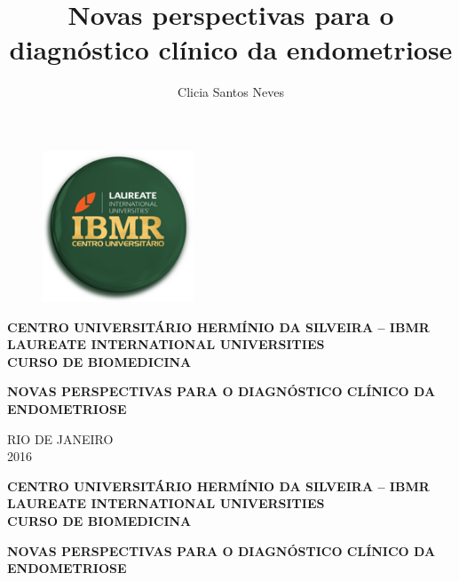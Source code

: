 \documentclass[12pt]{article} %
\title{Novas perspectivas para o diagnóstico clínico da endometriose}
\author{Clicia Santos Neves}
\begin{document}
\begin{figure}[h!]
\centering
\includegraphics[width=4.5cm]{ibmr.png}
\end{figure}
 \selectfont

\begin{center}
\textbf{CENTRO UNIVERSITÁRIO HERMÍNIO DA SILVEIRA – IBMR \\
LAUREATE INTERNATIONAL UNIVERSITIES \\
CURSO DE BIOMEDICINA}
\end{center}

\vspace{2.5cm}

\begin{center}
\MakeUppercase{\theauthor}
\end{center}

\vspace{3.5cm}

\begin{center}
\MakeUppercase{\textbf{Novas perspectivas para o diagnóstico clínico da endometriose}}
\end{center}

\vspace{5.5cm}

\begin{center}
\MakeUppercase{Rio de Janeiro}\\
2016
\end{center}

\newpage

\begin{center}
\textbf{CENTRO UNIVERSITÁRIO HERMÍNIO DA SILVEIRA – IBMR \\
LAUREATE INTERNATIONAL UNIVERSITIES \\
CURSO DE BIOMEDICINA}
\end{center}
\vspace{3.0cm}

\begin{center}
\MakeUppercase{\textbf{Novas perspectivas para o diagnóstico clínico da endometriose}}
\end{center}
\end{document}
